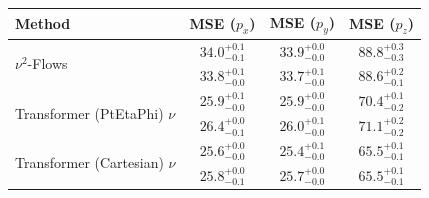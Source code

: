     \begin{tabular}{lccc}
        \toprule
        Method & MSE ($p_x$) & MSE ($p_y$) & MSE ($p_z$) \\
        \midrule
         \multirow{2}{*}{$\nu^2$-Flows}& $34.0_{-0.1}^{+0.1}$ & $33.9_{-0.0}^{+0.0}$ & $88.8_{-0.3}^{+0.3}$ \\
         & $33.8_{-0.0}^{+0.1}$ & $33.7_{-0.0}^{+0.1}$ & $88.6_{-0.1}^{+0.2}$ \\
        \midrule
         \multirow{2}{*}{Transformer (PtEtaPhi) $\nu$}& $25.9_{-0.0}^{+0.1}$ & $25.9_{-0.0}^{+0.0}$ & $70.4_{-0.2}^{+0.1}$ \\
         & $26.4_{-0.1}^{+0.0}$ & $26.0_{-0.0}^{+0.1}$ & $71.1_{-0.2}^{+0.2}$ \\
        \midrule
         \multirow{2}{*}{Transformer (Cartesian) $\nu$}& $25.6_{-0.0}^{+0.0}$ & $25.4_{-0.0}^{+0.1}$ & $65.5_{-0.1}^{+0.1}$ \\
         & $25.8_{-0.1}^{+0.0}$ & $25.7_{-0.0}^{+0.0}$ & $65.5_{-0.1}^{+0.1}$ \\
        \midrule
        \bottomrule
    \end{tabular}